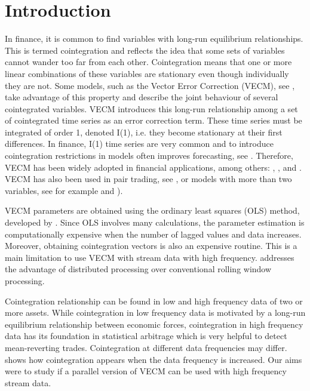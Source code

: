 \section{Introduction}
\label{sec:introduction}
In finance, it is common to find variables with long-run equilibrium
relationships. This is termed cointegration and reflects the idea that some sets
of variables cannot wander too far from each other. Cointegration means that one
or more linear combinations of these variables are stationary even though
individually they are not. Some models, such as the Vector Error Correction
(VECM), see \cite{engle87}, take advantage of this property and describe the
joint behaviour of several cointegrated variables. VECM introduces this long-run
relationship among a set of cointegrated time series as an error correction
term. These time series must be integrated of order 1, denoted I(1), i.e. they
become stationary at their first differences. In finance, I(1) time series are
very common and to introduce cointegration restrictions in models often improves
forecasting, see \cite{duy1998}. Therefore, VECM has been widely adopted in
financial applications, among others: \cite{mukherjee1995}, \cite{seong2013},
\cite{maysami2000} and \cite{arestis2001}. VECM has also been used in pair
trading, see \cite{herlemont2003}, or models with more than two variables, see
for example \cite{mukherjee1995} and \cite{engle2004}).

VECM parameters are obtained using the ordinary least squares (OLS) method,
developed by \cite{golub1980}. Since OLS involves many calculations, the
parameter estimation is computationally expensive when the number of lagged
values and data increases. Moreover, obtaining cointegration vectors is also an
expensive routine. This is a main limitation to use VECM with stream data with
high frequency. \cite{chen2003} addresses the advantage of distributed
processing over conventional rolling window processing. 

Cointegration relationship can be found in low and high frequency data of two
or more assets. While cointegration in low frequency data is motivated by a
long-run equilibrium relationship between economic forces, cointegration in
high frequency data has its foundation in statistical arbitrage which is very
helpful to detect mean-reverting trades. Cointegration at different data
frequencies may differ. \cite{rittler2012} shows how cointegration appears when
the data frequency is increased. Our aims were to study if a parallel
version of VECM can be used with high frequency stream data. 

